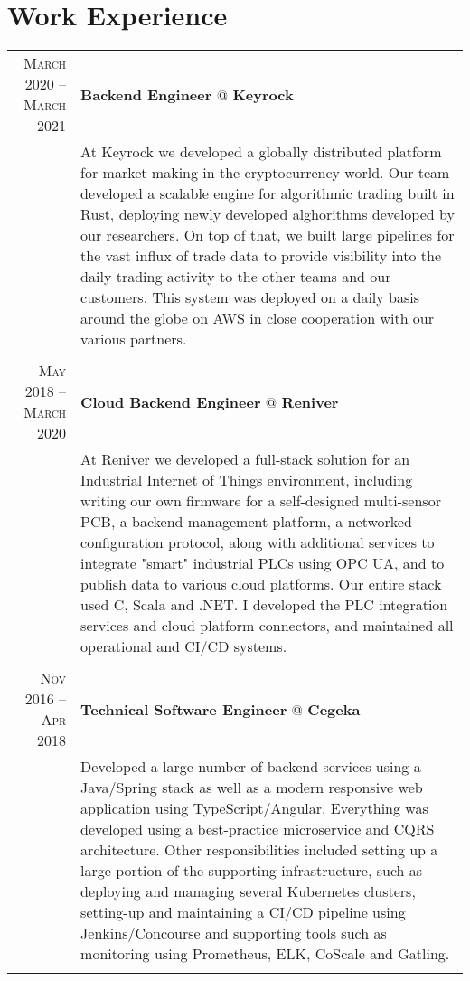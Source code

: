 \documentclass[a4paper,10pt]{article}
\begin{document}
\section{\textcolor{awesome-red}{Wor}k Experience}
        \begin{tabular}{r|p{11cm}}

        \textsc{March 2020 – March 2021} & \textbf{Backend Engineer} @ \textbf{Keyrock} \\ 
        & \footnotesize{At Keyrock we developed a globally distributed platform for market-making in the cryptocurrency world. Our team developed a scalable engine for algorithmic trading built in Rust, deploying newly developed alghorithms developed by our researchers. On top of that, we built large pipelines for the vast influx of trade data to provide visibility into the daily trading activity to the other teams and our customers. This system was deployed on a daily basis around the globe on AWS in close cooperation with our various partners.} \\
        \multicolumn{2}{c}{} \\
        

        \textsc{May 2018 – March 2020} & \textbf{Cloud Backend Engineer} @ \textbf{Reniver} \\ 
	& \footnotesize{At Reniver we developed a full-stack solution for an Industrial Internet of Things environment, including writing our own firmware for a self-designed multi-sensor PCB, a backend management platform, a networked configuration protocol, along with additional services to integrate "smart" industrial PLCs using OPC UA, and to publish data to various cloud platforms. Our entire stack used C, Scala and .NET. I developed the PLC integration services and cloud platform connectors, and maintained all operational and CI/CD systems. } \\
	\multicolumn{2}{c}{} \\
	
	
	\textsc{Nov 2016 – Apr 2018} & \textbf{Technical Software Engineer} @ \textbf{Cegeka} \\ 
	& \footnotesize{Developed a large number of backend services using a Java/Spring stack as well as a modern responsive web application using TypeScript/Angular. Everything was developed using a best-practice microservice and CQRS architecture. Other responsibilities included setting up a large portion of the supporting infrastructure, such as deploying and managing several Kubernetes clusters, setting-up and maintaining a CI/CD pipeline using Jenkins/Concourse and supporting tools such as monitoring using Prometheus, ELK, CoScale and Gatling.} \\
	\multicolumn{2}{c}{} \\


\end{tabular}
\end{document}
